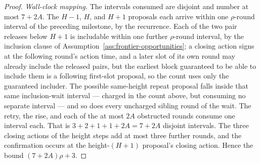 \begin{proof}
\emph{Wall-clock mapping.}  The intervals consumed are disjoint and
number at most \(7+2A\).  The \(H-1\), \(H\), and \(H+1\)
proposals each arrive within one \(\rho\)-round interval of the
preceding milestone, by the recurrence.  Each of the two pair releases
below \(H+1\) is includable within one further \(\rho\)-round
interval, by the inclusion clause of
Assumption~\ref{ass:frontier-opportunities}; a closing action signs at
the following round's action time, and a later slot of its own round
may already include the released pairs, but the earliest block
guaranteed to be able to include them is a following first-slot
proposal, so the count uses only the guaranteed includer.  The possible
same-height repeat proposal falls inside that same inclusion-wait
interval --- charged in the count above, but consuming no separate
interval --- and so does every uncharged sibling round of the wait.
The retry, the rise, and each of the at most \(2A\) obstructed rounds
consume one interval each.  That is \(3+2+1+1+2A=7+2A\) disjoint
intervals.  The three closing actions of the height steps add at most
three further rounds, and the confirmation occurs at the
height-\((H{+}1)\) proposal's closing action.  Hence the bound
\((7+2A)\rho+3\).
\end{proof}

